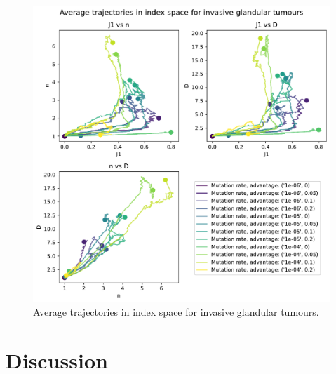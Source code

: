 \begin{figure} \centering
    \includegraphics[width=\textwidth]{Chapter_3/figures/indspace-inv-gland.pdf}
    \caption{Average trajectories in index space for invasive
    glandular tumours.}
    \label{fig:inv-gland-indspace}
\end{figure}



\section{Discussion}

